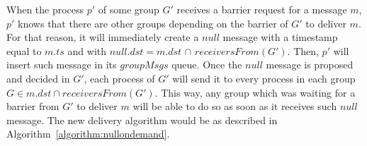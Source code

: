 \documentclass[times, 10pt]{article}
\begin{document}
When the process $p'$ of some group $G'$ receives a barrier request for a message $m$, %
$p'$ knows that there are other groups depending on the barrier of $G'$ to deliver $m$. For that reason, it will immediately create a $null$ message with a timestamp equal to $m.ts$ and with $null.dst = m.dst$ $\cap$ $receiversFrom(G')$. Then, $p'$ will insert such message in its %
$groupMsgs$ queue. %
Once the $null$ message is proposed and decided in $G'$, each process of $G'$ will send it to every process in each group \mbox{$G \in m.dst \cap receiversFrom(G')$}. This way, any group which was waiting for a barrier from $G'$ to deliver $m$ will be able to do so as soon as it receives such $null$ message. The new delivery algorithm would be as described in \mbox{Algorithm {\ref{algorithm:nullondemand}}}.
\end{document}
